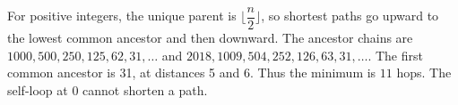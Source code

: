 For positive integers, the unique parent is $\lfloor\dfrac{n}{2}\rfloor $, so shortest paths go upward to the lowest common ancestor and then downward. The ancestor chains are $ 1000,500,250,125,62,31,\ldots $ and $ 2018,1009,504,252,126,63,31,\ldots $. The first common ancestor is 31, at distances 5 and 6. Thus the minimum is $\boxed{11}$ hops. The self-loop at 0 cannot shorten a path.
